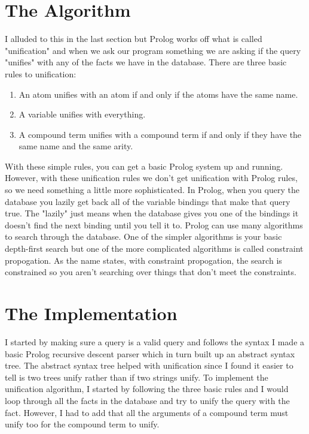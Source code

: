 \documentclass[a4paper, 12pt]{article}
\begin{document}
\section*{The Algorithm}

I alluded to this in the last section but Prolog works off what is called "unification" and when we ask our program something we are asking if the query "unifies" with any of the facts we have in the database. 
There are three basic rules to unification:

\begin{enumerate}
  \item An atom unifies with an atom if and only if the atoms have the same name.
  \item A variable unifies with everything.
  \item A compound term unifies with a compound term if and only if they have the same name and the same arity.
\end{enumerate}

With these simple rules, you can get a basic Prolog system up and running.
However, with these unification rules we don't get unification with Prolog rules, so we need something a little more sophisticated.
In Prolog, when you query the database you lazily get back all of the variable bindings that make that query true.
The "lazily" just means when the database gives you one of the bindings it doesn't find the next binding until you tell it to.
Prolog can use many algorithms to search through the database.
One of the simpler algorithms is your basic depth-first search but one of the more complicated algorithms is called constraint propogation.
As the name states, with constraint propogation, the search is constrained so you aren't searching over things that don't meet the constraints.

\section*{The Implementation}

I started by making sure a query is a valid query and follows the syntax I made a basic Prolog recursive descent parser which in turn built up an abstract syntax tree.
The abstract syntax tree helped with unification since I found it easier to tell is two trees unify rather than if two strings unify.
To implement the unification algorithm, I started by following the three basic rules and I would loop through all the facts in the database and try to unify the query with the fact.
However, I had to add that all the arguments of a compound term must unify too for the compound term to unify.
\end{document}
